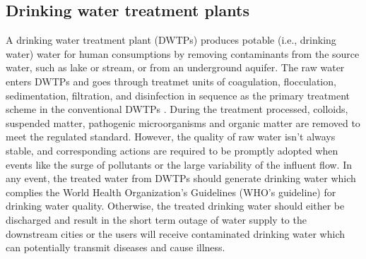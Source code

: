 \subsection{Drinking water treatment plants}
A drinking water treatment plant (DWTPs) produces potable (i.e., drinking water) water for human consumptions by removing contaminants from the source water, such as lake or stream, or from an underground aquifer. The raw water enters DWTPs and goes through treatmet units of coagulation, flocculation, sedimentation, filtration, and disinfection in sequence as the primary treatment scheme in the conventional DWTPs \citep{liRecentAdvancesArtificial2021}. 
During the treatment processed, colloids, suspended matter, pathogenic microorganisms and organic matter are removed to meet the regulated standard. However, the quality of raw water isn't always stable, and corresponding actions are required to be promptly adopted when events like the surge of pollutants or the large variability of the influent flow. In any event, the treated water from DWTPs should generate drinking water which complies the World Health Organization's Guidelines (WHO's guideline) for drinking water quality. Otherwise, the treated drinking water should either be discharged and result in the short term outage of water supply to the downstream cities or the users will receive contaminated drinking water which can potentially transmit diseases and cause illness.

